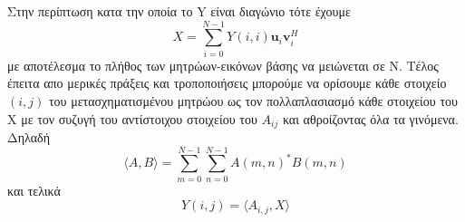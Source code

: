\hspace*{\fill}\newline
\newline
Στην περίπτωση κατα την οποία το \textlatin{Y} είναι διαγώνιο τότε έχουμε \\
\newline\hspace*{\fill}
\begin{equation}
        Χ = \sum_{i=0}^{N-1} Y(i,i)\mathbf{u}_{i}\mathbf{v}_{i}^{H}
\end{equation}
\hspace*{\fill}\newline
\newline
με αποτέλεσμα το πλήθος των μητρώων-εικόνων βάσης να μειώνεται σε Ν. Τέλος έπειτα απο μερικές πράξεις και τροποποιήσεις μπορούμε να ορίσουμε κάθε στοιχείο $(i,j)$ του μετασχηματισμένου μητρώου ως τον πολλαπλασιασμό κάθε στοιχείου του Χ με τον συζυγή του αντίστοιχου στοιχείου του $Α_{ij}$ και αθροίζοντας όλα τα γινόμενα. Δηλαδή
\newline\hspace*{\fill}
\begin{equation}
        \langle A,B \rangle = \sum_{m=0}^{N-1} \sum_{n=0}^{N-1} A(m,n)^{*}B(m,n)
\end{equation}
\hspace*{\fill}\newline
και τελικά
\newline\hspace*{\fill}
\begin{equation}
        Y(i,j) = \langle A_{i,j},X \rangle
\end{equation}
\hspace*{\fill}\newline

